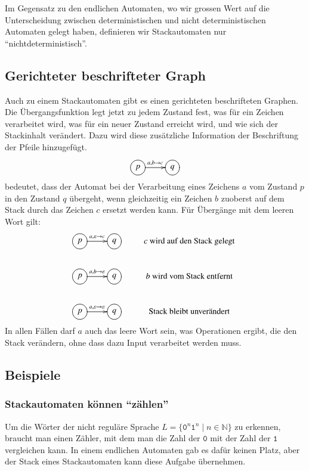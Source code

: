Im Gegensatz zu den endlichen Automaten, wo wir grossen Wert auf die
Unterscheidung zwischen deterministischen und nicht deterministischen
Automaten gelegt haben, definieren wir Stackautomaten nur
``nichtdeterministisch''.

\subsection{Gerichteter beschrifteter Graph}
%
Auch zu einem Stackautomaten gibt es einen gerichteten beschrifteten
Graphen. Die Übergangsfunktion legt jetzt zu jedem Zustand 
fest, was für ein Zeichen verarbeitet wird, was für ein
neuer Zustand erreicht wird, und wie sich der Stackinhalt
verändert.
Dazu wird diese zusätzliche Information der Beschriftung der Pfeile
hinzugefügt.
\[
\xymatrix{
*++[o][F]{p}\ar[r]^{a,b\to c}
	&*++[o][F]{q}
}
\]
bedeutet, dass der Automat bei der Verarbeitung eines Zeichens $a$
vom Zustand $p$ in den Zustand $q$ übergeht, wenn gleichzeitig
ein Zeichen $b$ zuoberst auf dem Stack durch das Zeichen $c$
ersetzt werden kann. Für Übergänge mit dem leeren Wort gilt:
\[
\xymatrix{
*++[o][F]{p}\ar[r]^{a,\varepsilon\to c}
	&*++[o][F]{q}
		&\text{$c$ wird auf den Stack gelegt}
\\
*++[o][F]{p}\ar[r]^{a,b\to\varepsilon}
	&*++[o][F]{q}
		&\text{$b$ wird vom Stack entfernt}
\\
*++[o][F]{p}\ar[r]^{a,\varepsilon\to\varepsilon}
	&*++[o][F]{q}
		&\text{Stack bleibt unverändert}
}
\]
In allen Fällen darf $a$ auch das leere Wort sein, was Operationen
ergibt, die den Stack verändern, ohne dass dazu Input verarbeitet werden
muss.


\subsection{Beispiele\label{stackbeispiele}}
\subsubsection{Stackautomaten können ``zählen''}
Um die Wörter der nicht reguläre Sprache
$L=\{\texttt{0}^n\texttt{1}^n\;|\;n\in \mathbb N\}$
zu erkennen, braucht man einen Zähler, mit dem man die Zahl der $\texttt{0}$
mit der Zahl der $\texttt{1}$ vergleichen kann. In einem endlichen Automaten
gab es dafür keinen Platz, aber der Stack eines Stackautomaten kann
diese Aufgabe übernehmen.

